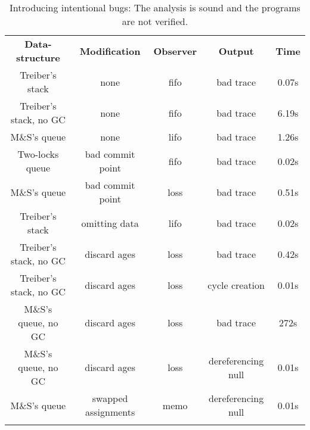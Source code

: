 %

{\footnotesize
\begin{table}[!t]%
\caption{Introducing intentional bugs: The analysis is sound and the programs are not verified.}
\label{experiments:bugs}
\centering
\begin{tabular}{|c|c|c||c|c|}\hhline{*{5}{=}}
 {\bf Data-structure}     & {\bf Modification} & {\bf Observer} & {\bf Output} & {\bf Time} \\\hhline{*{5}{=}}

  Treiber's stack         & none               & fifo           & bad trace    & 0.07s      \\\hline %
  Treiber's stack, no GC  & none               & fifo           & bad trace    & 6.19s      \\\hline %
  M\&S's queue            & none               & lifo           & bad trace    & 1.26s      \\\hline %
  Two-locks queue         & bad commit point   & fifo           & bad trace    & 0.02s      \\\hline %
  M\&S's queue            & bad commit point   & loss           & bad trace    & 0.51s      \\\hline %
  Treiber's stack         & omitting data      & lifo           & bad trace    & 0.02s      \\\hline %
  Treiber's stack, no GC  & discard ages       & loss           & bad trace    & 0.42s      \\\hline %
  Treiber's stack, no GC  & discard ages       & loss           & cycle creation & 0.01s    \\\hline %
  M\&S's queue, no GC     & discard ages       & loss           & bad trace    & 272s       \\\hline %
  M\&S's queue, no GC     & discard ages       & loss           & dereferencing null & 0.01s \\\hline %
  M\&S's queue            & swapped assignments& memo           & dereferencing null & 0.01s \\ %
  \hhline{*{5}{=}} 
\end{tabular}
\end{table}%
}%

